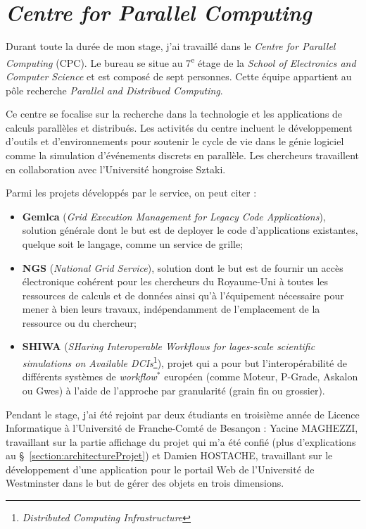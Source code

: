 \section{\textit{Centre for Parallel Computing}}

Durant toute la dur\'ee de mon stage, j'ai travaill\'e dans le \textit{Centre for Parallel Computing} (CPC).
Le bureau se situe au 7\textsuperscript{e} \'etage de la \textit{School of Electronics and Computer Science} et est compos\'e de sept personnes.
Cette \'equipe appartient au p\^ole recherche \textit{Parallel and Distribued Computing}.

Ce centre se focalise sur la recherche dans la technologie et les applications de calculs parall\`eles et distribu\'es.
Les activit\'es du centre incluent le d\'eveloppement d'outils et d'environnements pour soutenir le cycle de vie dans le g\'enie logiciel comme la simulation d'\'ev\'enements discrets en parall\`ele.
Les chercheurs travaillent en collaboration avec l'Universit\'e hongroise Sztaki.

\noindent Parmi les projets d\'evelopp\'es par le service, on peut citer :

\begin{itemize}
	\item \textbf{Gemlca} (\textit{Grid Execution Management for Legacy Code Applications}), solution g\'en\'erale dont le but est de deployer le code d'applications existantes, quelque soit le langage, comme un service de grille;
	\item \textbf{NGS} (\textit{National Grid Service}), solution dont le but est de fournir un acc\`es \'electronique coh\'erent pour les chercheurs du Royaume-Uni \`a toutes les ressources de calculs et de donn\'ees ainsi qu'\`a l'\'equipement n\'ecessaire pour mener \`a bien leurs travaux, ind\'ependamment de l'emplacement de la ressource ou du chercheur;
	\item \textbf{SHIWA} (\textit{SHaring Interoperable Workflows for lages-scale scientific simulations on Available DCIs}\protect\footnote{\textit{Distributed Computing Infrastructure}}), projet qui a pour but l'interop\'erabilit\'e de diff\'erents syst\`emes de \textit{workflow}$^*$ europ\'een (comme Moteur, P-Grade, Askalon ou Gwes) \`a l'aide de l'approche par granularit\'e (grain fin ou grossier).

\end{itemize}

\vspace{0.20cm}

Pendant le stage, j'ai \'et\'e rejoint par deux \'etudiants en troisi\`eme ann\'ee de Licence Informatique \`a l'Universit\'e de Franche-Comt\'e de Besan\c{c}on : Yacine MAGHEZZI, travaillant sur la partie affichage du projet qui m'a \'et\'e confi\'e (plus d'explications au \S~\ref{section:architectureProjet}) et Damien HOSTACHE, travaillant sur le d\'eveloppement d'une application pour le portail Web de l'Universit\'e de Westminster dans le but de g\'erer des objets en trois dimensions.


\clearpage

